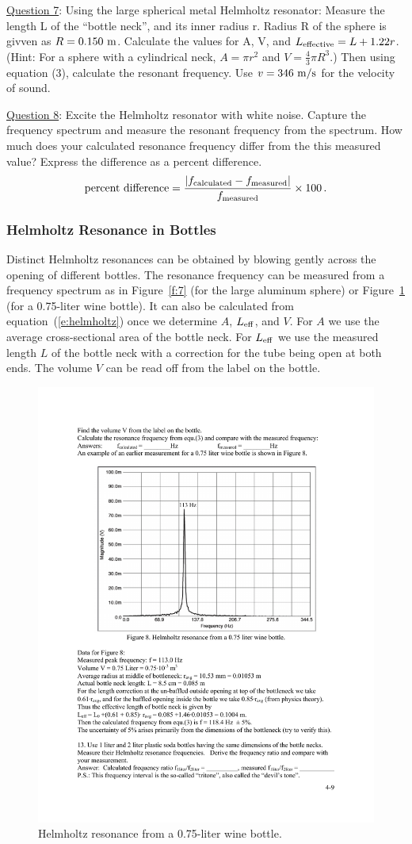 \documentclass[11pt]{NSF}
\def\be{\begin{equation}}
\def\ee{\end{equation}}
\begin{document}
\underline{Question 7}: Using the large spherical metal Helmholtz resonator: Measure the length L of the “bottle neck”, and its inner radius r. Radius R of the sphere is givven as $R=0.150~{\rm m}$. Calculate the values for A, V, and  $L_{\rm effective}=L+1.22 r$. (Hint: For a sphere with a cylindrical neck, $A=\pi r^2$ and $V = \frac{4}{3}\pi R^3$.)
Then using equation (3), calculate the resonant frequency. Use $v=346~{\rm m/s}$ for the 
velocity of sound. 

\underline{Question 8}: Excite the Helmholtz resonator with white noise. Capture the frequency spectrum and measure the resonant frequency from the spectrum. How much does your calculated resonance frequency differ from the this measured value? Express the difference as a percent difference.
\be
\text{percent difference} = 
\frac{|f_{\rm calculated}-f_{\rm measured}|}{f_{\rm measured}} 
\times 100\,.\ee

\subsubsection{Helmholtz Resonance in Bottles}

Distinct Helmholtz resonances can be obtained by blowing 
gently across the opening of different bottles. 
The resonance frequency can be measured from a 
frequency spectrum as in Figure~\ref{f:7} (for the 
large aluminum sphere) or 
Figure~\ref{f:8} (for a 0.75-liter wine bottle).
It can also be calculated from equation~(\ref{e:helmholtz})
once we determine $A$, $L_{\rm eff}$, and $V$.
For $A$ we use the average cross-sectional area of the
bottle neck.
For $L_{\rm eff}$ we use the measured length $L$ of the 
bottle neck with a correction for the tube being open at 
both ends.
The volume $V$ can be read off from the label on the bottle.
%
\begin{figure}[hbtp]
\begin{center}
\includegraphics[width=.7\textwidth]{fig4_8}
\caption{Helmholtz resonance from a 0.75-liter wine bottle.}
\label{f:8} 
\end{center} 
\end{figure}
%
\end{document}
